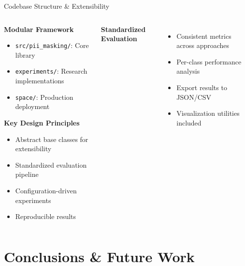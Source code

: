 \documentclass[aspectratio=169]{beamer}
\begin{document}
\begin{frame}{Codebase Structure \& Extensibility}
\begin{columns}
\begin{column}{0.5\textwidth}
\textbf{Modular Framework}
\begin{itemize}
\item \texttt{src/pii\_masking/}: Core library
\item \texttt{experiments/}: Research implementations  
\item \texttt{space/}: Production deployment
\end{itemize}

\vspace{0.3cm}
\textbf{Key Design Principles}
\begin{itemize}
\item Abstract base classes for extensibility
\item Standardized evaluation pipeline
\item Configuration-driven experiments
\item Reproducible results
\end{itemize}
\end{column}

\vspace{0.2cm}
\textbf{Standardized Evaluation}
\begin{itemize}
\item Consistent metrics across approaches
\item Per-class performance analysis
\item Export results to JSON/CSV
\item Visualization utilities included
\end{itemize}
\end{columns}
\end{frame}

\section{Conclusions \& Future Work}
\end{document}
